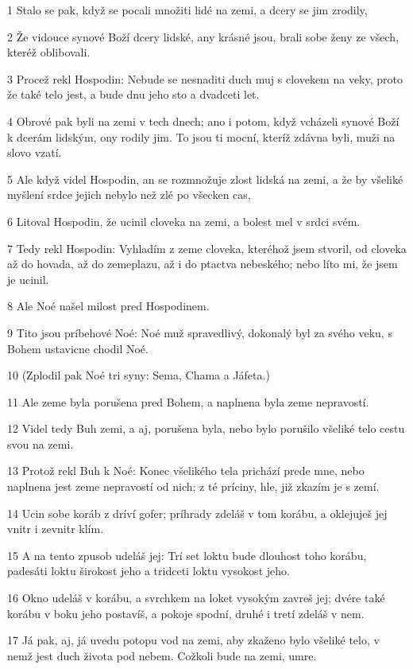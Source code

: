 \par 1 Stalo se pak, když se pocali množiti lidé na zemi, a dcery se jim zrodily,
\par 2 Že vidouce synové Boží dcery lidské, any krásné jsou, brali sobe ženy ze všech, kteréž oblibovali.
\par 3 Procež rekl Hospodin: Nebude se nesnaditi duch muj s clovekem na veky, proto že také telo jest, a bude dnu jeho sto a dvadceti let.
\par 4 Obrové pak byli na zemi v tech dnech; ano i potom, když vcházeli synové Boží k dcerám lidským, ony rodily jim. To jsou ti mocní, kteríž zdávna byli, muži na slovo vzatí.
\par 5 Ale když videl Hospodin, an se rozmnožuje zlost lidská na zemi, a že by všeliké myšlení srdce jejich nebylo než zlé po všecken cas,
\par 6 Litoval Hospodin, že ucinil cloveka na zemi, a bolest mel v srdci svém.
\par 7 Tedy rekl Hospodin: Vyhladím z zeme cloveka, kteréhož jsem stvoril, od cloveka až do hovada, až do zemeplazu, až i do ptactva nebeského; nebo líto mi, že jsem je ucinil.
\par 8 Ale Noé našel milost pred Hospodinem.
\par 9 Tito jsou príbehové Noé: Noé muž spravedlivý, dokonalý byl za svého veku, s Bohem ustavicne chodil Noé.
\par 10 (Zplodil pak Noé tri syny: Sema, Chama a Jáfeta.)
\par 11 Ale zeme byla porušena pred Bohem, a naplnena byla zeme nepravostí.
\par 12 Videl tedy Buh zemi, a aj, porušena byla, nebo bylo porušilo všeliké telo cestu svou na zemi.
\par 13 Protož rekl Buh k Noé: Konec všelikého tela prichází prede mne, nebo naplnena jest zeme nepravostí od nich; z té príciny, hle, již zkazím je s zemí.
\par 14 Ucin sobe koráb z dríví gofer; príhrady zdeláš v tom korábu, a oklejuješ jej vnitr i zevnitr klím.
\par 15 A na tento zpusob udeláš jej: Trí set loktu bude dlouhost toho korábu, padesáti loktu širokost jeho a tridceti loktu vysokost jeho.
\par 16 Okno udeláš v korábu, a svrchkem na loket vysokým zavreš jej; dvére také korábu v boku jeho postavíš, a pokoje spodní, druhé i tretí zdeláš v nem.
\par 17 Já pak, aj, já uvedu potopu vod na zemi, aby zkaženo bylo všeliké telo, v nemž jest duch života pod nebem. Cožkoli bude na zemi, umre.
